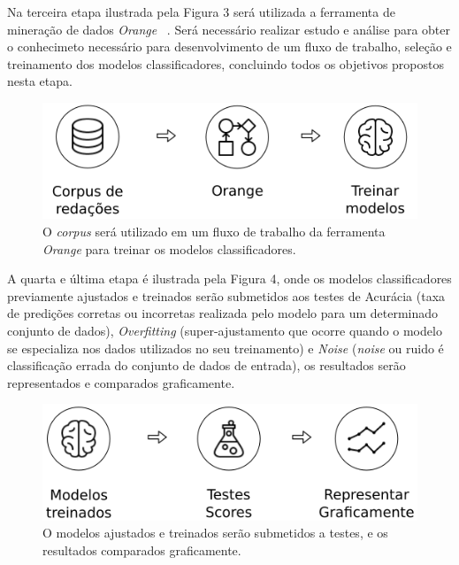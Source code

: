 Na terceira etapa ilustrada pela Figura 3 será utilizada a ferramenta de mineração de dados \textit{Orange} ~\cite{orange_3:2017}. Será necessário realizar estudo e análise para obter o conhecimeto necessário para desenvolvimento de um fluxo de trabalho, seleção e treinamento dos modelos classificadores, concluindo todos os objetivos propostos nesta etapa.

\begin{figure}[H]
\begin{center}
    \includegraphics[scale=0.75]{figuras/metodologia_3.png}
\end{center}
\caption{O \textit{corpus} será utilizado em um fluxo de trabalho da ferramenta \textit{Orange} para treinar os modelos classificadores.}
\label{Img:OrangeTrain}
\end{figure}

A quarta e última etapa é ilustrada pela Figura 4, onde os modelos classificadores previamente ajustados e treinados serão submetidos aos testes de Acurácia (taxa de predições corretas ou incorretas realizada pelo modelo para um determinado conjunto de dados), \textit{Overfitting} (super-ajustamento que ocorre quando o modelo se especializa nos dados utilizados no seu treinamento) e \textit{Noise} (\textit{noise} ou ruido é classificação errada do conjunto de dados de entrada), os resultados serão representados e comparados graficamente.
\begin{figure}[H]
\begin{center}
    \includegraphics[scale=0.75]{figuras/metodologia_4.png}
\end{center}
\caption{O modelos ajustados e treinados serão submetidos a testes, e os resultados comparados graficamente.}
\label{Img:TestsScores}
\end{figure}
